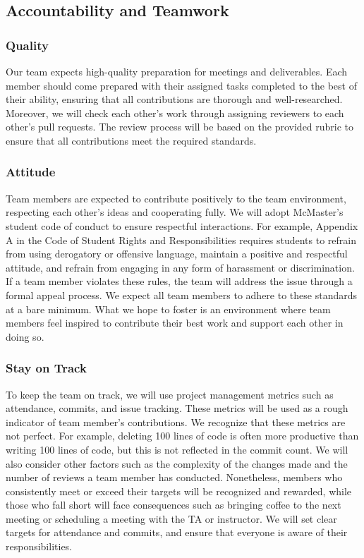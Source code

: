 \documentclass{article}
\begin{document}
\subsection*{Accountability and Teamwork}

\subsubsection*{Quality}

Our team expects high-quality preparation for meetings and deliverables. Each member should come prepared with their assigned tasks completed to the best of their ability, ensuring that all contributions are thorough and well-researched. Moreover, we will check each other's work through assigning reviewers to each other's pull requests. The review process will be based on the provided rubric to ensure that all contributions meet the required standards.

\subsubsection*{Attitude}

Team members are expected to contribute positively to the team environment, respecting each other's ideas and cooperating fully. We will adopt McMaster's student code of conduct to ensure respectful interactions. For example, Appendix A in the Code of Student Rights and Responsibilities requires students to refrain from using derogatory or offensive language, maintain a positive and respectful attitude, and refrain from engaging in any form of harassment or discrimination. If a team member violates these rules, the team will address the issue through a formal appeal process. We expect all team members to adhere to these standards at a bare minimum. What we hope to foster is an environment where team members feel inspired to contribute their best work and support each other in doing so.

\subsubsection*{Stay on Track}

To keep the team on track, we will use project management metrics such as attendance, commits, and issue tracking. These metrics will be used as a rough indicator of team member's contributions. We recognize that these metrics are not perfect. For example, deleting 100 lines of code is often more productive than writing 100 lines of code, but this is not reflected in the commit count. We will also consider other factors such as the complexity of the changes made and the number of reviews a team member has conducted. Nonetheless, members who consistently meet or exceed their targets will be recognized and rewarded, while those who fall short will face consequences such as bringing coffee to the next meeting or scheduling a meeting with the TA or instructor. We will set clear targets for attendance and commits, and ensure that everyone is aware of their responsibilities.
\end{document}
